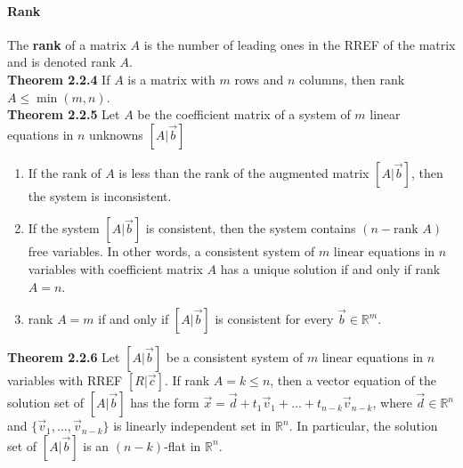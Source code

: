\documentclass[10pt,letter]{article}
\begin{document}
\paragraph{Rank} The \textbf{rank} of a matrix $A$ is the number of leading ones in the RREF of the matrix and is denoted rank $A$. \\ 
\textbf{Theorem 2.2.4} If $A$ is a matrix with $m$ rows and $n$ columns, then rank $A\leq \min(m,n)$. \\ 
\textbf{Theorem 2.2.5} Let $A$ be the coefficient matrix of a system of $m$ linear equations in $n$ unknowns $[A|\vec{b}]$ \begin{enumerate}
    \item If the rank of $A$ is less than the rank of the augmented matrix $[A|\vec{b}]$, then the system is inconsistent. 
    \item If the system $[A|\vec{b}]$ is consistent, then the system contains $(n-\text{rank }A)$ free variables. In other words, a consistent system of $m$ linear equations in $n$ variables with coefficient matrix $A$ has a unique solution if and only if rank $A=n$. 
    \item rank $A=m$ if and only if $[A|\vec{b}]$ is consistent for every $\vec{b}\in\mathbb{R}^m$. 
\end{enumerate}
\textbf{Theorem 2.2.6} Let $[A|\vec{b}]$ be a consistent system of $m$ linear equations in $n$ variables with RREF $[R|\vec{c}]$. If rank $A=k\leq n$, then a vector equation of the solution set of $[A|\vec{b}]$ has the form $\vec{x}=\vec{d}+t_1\vec{v}_1+\ldots+t_{n-k}\vec{v}_{n-k}$, where $\vec{d}\in\mathbb{R}^n$ and $\{\vec{v}_1,\ldots,\vec{v}_{n-k}\}$ is linearly independent set in $\mathbb{R}^n$. In particular, the solution set of $[A|\vec{b}]$ is an $(n-k)$-flat in $\mathbb{R}^n$.  
\end{document}

